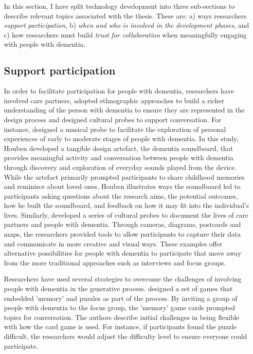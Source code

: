 In this section, I have split technology development into three sub-sections to describe relevant topics associated with the thesis. These are: a) ways researchers \textit{support participation}, b) \textit{when and who is involved in the development phases}, and c) how researchers must build \textit{trust for collaboration} when meaningfully engaging with people with dementia.

\subsection{Support participation}
\label{BL:SupportParticipation}
In order to facilitate participation for people with dementia, researchers have involved care partners, adopted ethnographic approaches to build a richer understanding of the person with dementia to ensure they are represented in the design process and designed cultural probes to support conversation. For instance, \cite{houben_foregrounding_2019} designed a musical probe to facilitate the exploration of personal experiences of early to moderate stages of people with dementia. In this study, Houben developed a tangible design artefact, the dementia soundboard, that provides meaningful activity and conversation between people with dementia through discovery and exploration of everyday sounds played from the device. While the artefact primarily prompted participants to share childhood memories and reminisce about loved ones, Houben illustrates ways the soundboard led to participants asking questions about the research aims, the potential outcomes, how he built the soundboard, and feedback on how it may fit into the individual's lives. Similarly, \cite{brown2014using} developed a series of cultural probes to document the lives of care partners and people with dementia. Through cameras, diagrams, postcards and maps, the researchers provided tools to allow participants to capture their data and communicate in more creative and visual ways. These examples offer alternative possibilities for people with dementia to participate that move away from the more traditional approaches such as interviews and focus groups.

Researchers have used several strategies to overcome the challenges of involving people with dementia in the generative process. \cite{mayer2013lessons} designed a set of games that embedded 'memory' and puzzles as part of the process. By inviting a group of people with dementia to the focus group, the 'memory' game cards prompted topics for conversation. The authors describe initial challenges in being flexible with how the card game is used. For instance, if participants found the puzzle difficult, the researchers would adjust the difficulty level to ensure everyone could participate.

